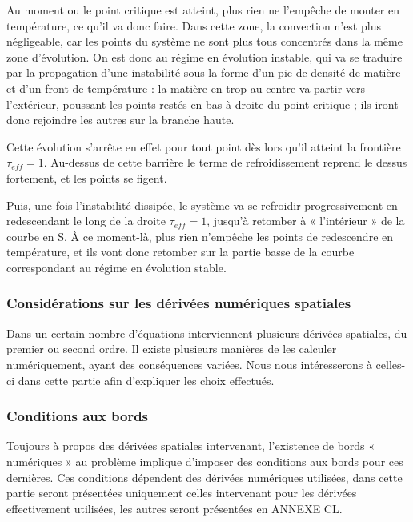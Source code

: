 Au moment ou le point critique est atteint, plus rien ne l’empêche de monter en température, ce
qu’il va donc faire. Dans cette zone, la convection n’est plus négligeable, car
les points du système ne sont plus tous concentrés dans la même zone
d’évolution. On est donc au régime en évolution instable, qui va se traduire par la propagation d'une instabilité sous la forme d’un pic
de densité de matière et d’un front de température : la matière en trop au
centre va partir vers l’extérieur, poussant les points restés en bas à droite
du point critique ; ils iront donc rejoindre les autres sur la branche haute.

Cette évolution s’arrête en effet pour tout point dès lors qu’il atteint la
frontière $\tau_{eff} = 1$. Au-dessus de cette barrière le terme de
refroidissement reprend le dessus fortement, et les points se figent.

Puis, une fois l’instabilité dissipée, le système va se refroidir
progressivement en redescendant le long de la droite $\tau_{eff} = 1$, jusqu’à
retomber à « l’intérieur » de la courbe en S. À ce moment-là, plus rien
n’empêche les points de redescendre en température, et ils vont donc retomber
sur la partie basse de la courbe correspondant au régime en évolution stable.


\subsubsection{Considérations sur les dérivées numériques spatiales}

Dans un certain nombre d’équations interviennent plusieurs dérivées spatiales,
du premier ou second ordre. Il existe plusieurs manières de les calculer
numériquement, ayant des conséquences variées. Nous nous intéresserons à
celles-ci dans cette partie afin d’expliquer les choix effectués.

\subsubsection{Conditions aux bords}

Toujours à propos des dérivées spatiales intervenant, l’existence de bords «
numériques » au problème implique d’imposer des conditions aux bords pour ces
dernières. Ces conditions dépendent des dérivées numériques utilisées, dans
cette partie seront présentées uniquement celles intervenant pour les dérivées
effectivement utilisées, les autres seront présentées en ANNEXE CL.

